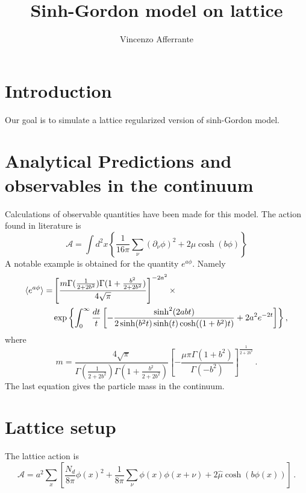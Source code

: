 \documentclass[12pt]{report}
\begin{document}
 

 
\title{Sinh-Gordon model on lattice}
\author{Vincenzo Afferrante} 
 
\maketitle

\chapter{Introduction} 

Our goal is to simulate  a lattice regularized version of sinh-Gordon model.

\chapter{Analytical Predictions and observables in the continuum }

Calculations of observable quantities have been made for this model. The action found in literature is \begin{equation}
\mathcal{A} = \int d^2x \left\lbrace\dfrac{1}{16 \pi} \sum_\nu (\partial_\nu \phi )^2 + 2 \mu \cosh(b \phi) \right\rbrace
\end{equation}  A notable example is obtained for the quantity $e^{a\phi}$. Namely
\begin{align}
\braket{e^{a \phi}} =  &\left[ \dfrac{m\Gamma(\frac{1}{2+2b^2}) \Gamma(1+ \frac{b^2}{2+2b^2}) }{4 \sqrt{\pi}}  \right]^{-2 a^2} \times \nonumber \\ & \exp{\left\lbrace \int_0^\infty \dfrac{dt}{t} \left[ - \dfrac{\sinh^2(2 a b t)}{2 \sinh(b^2t) \sinh(t)\cosh((1+b^2)t) } + 2 a^2 e^{-2t} \right]  \right\rbrace } \,,
\end{align} where \begin{equation}
m = \dfrac{4 \sqrt{\pi}}{\Gamma(\frac{1}{2+2b^2})\Gamma(1 +\frac{b^2}{2+2b^2}) } \left[ - \dfrac{\mu \pi \Gamma(1+b^2)}{\Gamma(-b^2)} \right]^{\frac{1}{2+2b^2}} \,.
\end{equation} The last equation gives the particle mass in the continuum. 

\chapter{Lattice setup}

The lattice action is \begin{equation}
\mathcal{A} = a^2 \sum_x \left[ \dfrac{N_d}{8 \pi} \phi(x)^2 + \dfrac{1}{8\pi} \sum_\nu \phi(x) \phi(x+\nu) +2 \hat \mu \cosh(b\phi(x)) \right] \,.
\end{equation} 
\end{document}
